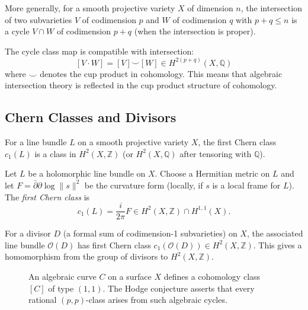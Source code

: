 More generally, for a smooth projective variety $X$ of dimension $n$, the intersection of two subvarieties $V$ of codimension $p$ and $W$ of codimension $q$ with $p + q \le n$ is a cycle $V \cap W$ of codimension $p + q$ (when the intersection is proper).

The cycle class map is compatible with intersection:
\[
[V \cdot W] = [V] \smile [W] \in H^{2(p+q)}(X, \mathbb{Q})
\]
where $\smile$ denotes the cup product in cohomology. This means that algebraic intersection theory is reflected in the cup product structure of cohomology.

\subsection{Chern Classes and Divisors}

For a line bundle $L$ on a smooth projective variety $X$, the first Chern class $c_1(L)$ is a class in $H^2(X, \mathbb{Z})$ (or $H^2(X, \mathbb{Q})$ after tensoring with $\mathbb{Q}$).

\begin{definition}
Let $L$ be a holomorphic line bundle on $X$. Choose a Hermitian metric on $L$ and let $F = \bar{\partial}\partial \log\|s\|^2$ be the curvature form (locally, if $s$ is a local frame for $L$). The \emph{first Chern class} is
\[
c_1(L) = \frac{i}{2\pi} F \in H^2(X, \mathbb{Z}) \cap H^{1,1}(X).
\]
\end{definition}

For a divisor $D$ (a formal sum of codimension-1 subvarieties) on $X$, the associated line bundle $\mathcal{O}(D)$ has first Chern class $c_1(\mathcal{O}(D)) \in H^2(X, \mathbb{Z})$. This gives a homomorphism from the group of divisors to $H^2(X, \mathbb{Z})$.

\begin{figure}[htbp]
\centering
{}
\caption{An algebraic curve $C$ on a surface $X$ defines a cohomology class $[C]$ of type $(1,1)$. The Hodge conjecture asserts that every rational $(p,p)$-class arises from such algebraic cycles.}
\label{fig:algebraic-cycle}
\end{figure}

